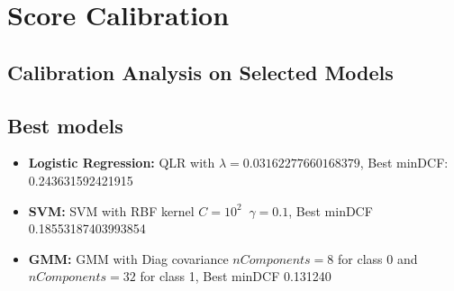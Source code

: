 \documentclass{article}
\begin{document}
\section{Score Calibration}
\subsection{Calibration Analysis on Selected Models}
\subsection*{Best models}
\begin{itemize}
    \item \textbf{Logistic Regression:} QLR with \(\lambda=0.03162277660168379\), Best minDCF: 0.243631592421915
    \item \textbf{SVM:} SVM with RBF kernel \(C=10^2\;\; \gamma=0.1\), Best minDCF  0.18553187403993854
    \item \textbf{GMM:} GMM with Diag covariance \(nComponents=8\) for class 0 and \(nComponents=32\) for class 1, Best minDCF 0.131240
\end{itemize}
\end{document}
